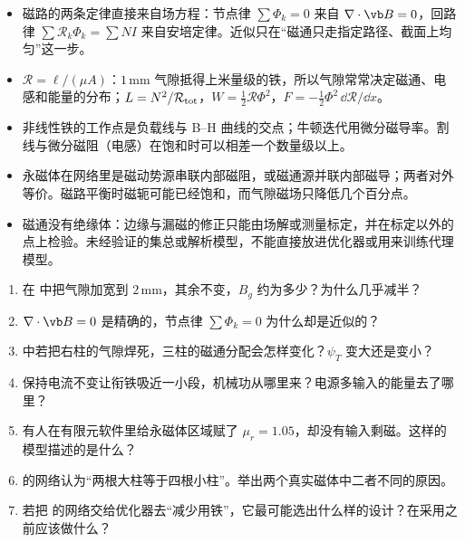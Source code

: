 \begin{takeaways}
\begin{itemize}
\item 磁路的两条定律直接来自场方程：节点律 $\sum\Phi_k=0$ 来自 $\nabla\cdot\vb B=0$，回路律 $\sum\mathcal R_k\Phi_k=\sum NI$ 来自安培定律。近似只在“磁通只走指定路径、截面上均匀”这一步。
\item $\mathcal R=\ell/(\mu A)$：$1\,\mathrm{mm}$ 气隙抵得上米量级的铁，所以气隙常常决定磁通、电感和能量的分布；$L=N^2/\mathcal R_{\rm tot}$，$W=\tfrac12\mathcal R\Phi^2$，$F=-\tfrac12\Phi^2\,\dd\mathcal R/\dd x$。
\item 非线性铁的工作点是负载线与 B--H 曲线的交点；牛顿迭代用微分磁导率。割线与微分磁阻（电感）在饱和时可以相差一个数量级以上。
\item 永磁体在网络里是磁动势源串联内部磁阻，或磁通源并联内部磁导；两者对外等价。磁路平衡时磁轭可能已经饱和，而气隙磁场只降低几个百分点。
\item 磁通没有绝缘体：边缘与漏磁的修正只能由场解或测量标定，并在标定以外的点上检验。未经验证的集总或解析模型，不能直接放进优化器或用来训练代理模型。
\end{itemize}
\end{takeaways}

\begin{selfcheck}
\begin{enumerate}
\item 在 中把气隙加宽到 $2\,\mathrm{mm}$，其余不变，$B_g$ 约为多少？为什么几乎减半？
\item $\nabla\cdot\vb B=0$ 是精确的，节点律 $\sum\Phi_k=0$ 为什么却是近似的？
\item {} 中若把右柱的气隙焊死，三柱的磁通分配会怎样变化？$\psi_T$ 变大还是变小？
\item 保持电流不变让衔铁吸近一小段，机械功从哪里来？电源多输入的能量去了哪里？
\item 有人在有限元软件里给永磁体区域赋了 $\mu_r=1.05$，却没有输入剩磁。这样的模型描述的是什么？
\item {} 的网络认为“两根大柱等于四根小柱”。举出两个真实磁体中二者不同的原因。
\item 若把 的网络交给优化器去“减少用铁”，它最可能选出什么样的设计？在采用之前应该做什么？
\end{enumerate}
\end{selfcheck}

